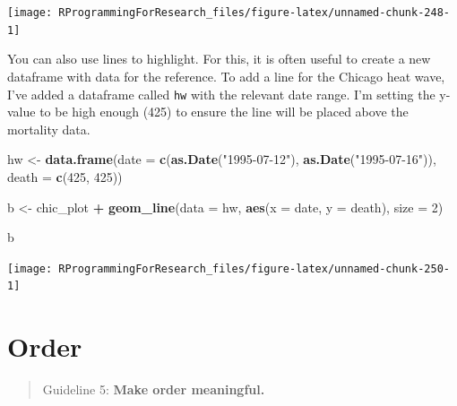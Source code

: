 \documentclass[]{book}
\makeatletter
\newenvironment{Shaded}{\begin{snugshade}}{\end{snugshade}}
\newcommand{\KeywordTok}[1]{\textcolor[rgb]{0.13,0.29,0.53}{\textbf{#1}}}
\newcommand{\DataTypeTok}[1]{\textcolor[rgb]{0.13,0.29,0.53}{#1}}
\newcommand{\DecValTok}[1]{\textcolor[rgb]{0.00,0.00,0.81}{#1}}
\newcommand{\StringTok}[1]{\textcolor[rgb]{0.31,0.60,0.02}{#1}}
\newcommand{\OperatorTok}[1]{\textcolor[rgb]{0.81,0.36,0.00}{\textbf{#1}}}
\newcommand{\NormalTok}[1]{#1}
\newenvironment{kframe}{%
\medskip{}
\setlength{\fboxsep}{.8em}
 \def\at@end@of@kframe{}%
 \ifinner\ifhmode%
  \def\at@end@of@kframe{\end{minipage}}%
  \begin{minipage}{\columnwidth}%
 \fi\fi%
 \def\FrameCommand##1{\hskip\@totalleftmargin \hskip-\fboxsep
 \colorbox{shadecolor}{##1}\hskip-\fboxsep
     \hskip-\linewidth \hskip-\@totalleftmargin \hskip\columnwidth}%
 \MakeFramed {\advance\hsize-\width
   \@totalleftmargin\z@ \linewidth\hsize
   \@setminipage}}%
 {\par\unskip\endMakeFramed%
 \at@end@of@kframe}
\renewenvironment{Shaded}{\begin{kframe}}{\end{kframe}}
\theoremstyle{definition}
\theoremstyle{definition}
\theoremstyle{definition}
\theoremstyle{remark}
\makeatother
\begin{document}
\begin{center}\texttt{[image: RProgrammingForResearch\_files/figure-latex/unnamed-chunk-248-1]} \end{center}

You can also use lines to highlight. For this, it is often useful to
create a new dataframe with data for the reference. To add a line for
the Chicago heat wave, I've added a dataframe called \texttt{hw} with
the relevant date range. I'm setting the y-value to be high enough (425)
to ensure the line will be placed above the mortality data.

\begin{Shaded}
\begin{Highlighting}[]
\NormalTok{hw <-}\StringTok{ }\KeywordTok{data.frame}\NormalTok{(}\DataTypeTok{date =} \KeywordTok{c}\NormalTok{(}\KeywordTok{as.Date}\NormalTok{(}\StringTok{"1995-07-12"}\NormalTok{), }
                          \KeywordTok{as.Date}\NormalTok{(}\StringTok{"1995-07-16"}\NormalTok{)),}
                 \DataTypeTok{death =} \KeywordTok{c}\NormalTok{(}\DecValTok{425}\NormalTok{, }\DecValTok{425}\NormalTok{))}
        
\NormalTok{b <-}\StringTok{ }\NormalTok{chic_plot }\OperatorTok{+}\StringTok{ }
\StringTok{        }\KeywordTok{geom_line}\NormalTok{(}\DataTypeTok{data =}\NormalTok{ hw,}
                  \KeywordTok{aes}\NormalTok{(}\DataTypeTok{x =}\NormalTok{ date, }\DataTypeTok{y =}\NormalTok{ death),}
                  \DataTypeTok{size =} \DecValTok{2}\NormalTok{)}
\end{Highlighting}
\end{Shaded}

\begin{Shaded}
\begin{Highlighting}[]
\NormalTok{b}
\end{Highlighting}
\end{Shaded}

\begin{center}\texttt{[image: RProgrammingForResearch\_files/figure-latex/unnamed-chunk-250-1]} \end{center}

\section{Order}\label{order}

\begin{quote}
Guideline 5: \textbf{Make order meaningful.}
\end{quote}
\end{document}
